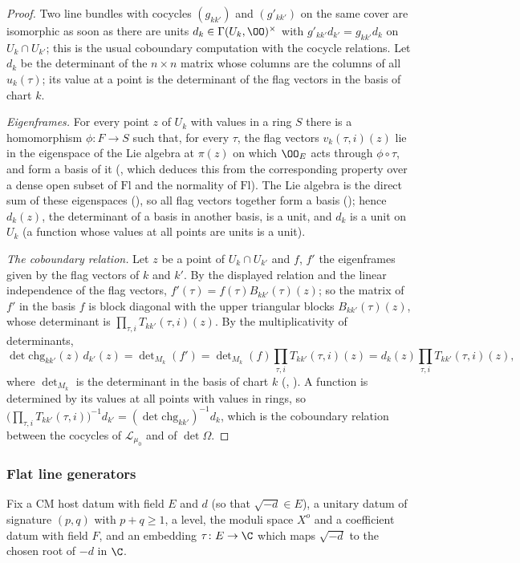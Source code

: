 \begin{proof}
Two line bundles with cocycles $(g_{kk'})$ and $(g'_{kk'})$ on the same cover are isomorphic as soon as
there are units $d_k\in\Gamma(U_k,\OO)^\times$ with $g'_{kk'}d_{k'}=g_{kk'}d_k$ on $U_k\cap U_{k'}$; this is
the usual coboundary computation with the cocycle relations. Let $d_k$ be the determinant of the $n\times n$
matrix whose columns are the columns of all $u_k(\tau)$; its value at a point is the determinant of the
flag vectors in the basis of chart $k$.

\emph{Eigenframes.} For every point $z$ of $U_k$ with values in a ring $S$ there is a homomorphism
$\phi\colon F\to S$ such that, for every $\tau$, the flag vectors $v_k(\tau,i)(z)$ lie in the eigenspace of
the Lie algebra at $\pi(z)$ on which $\OO_E$ acts through $\phi\circ\tau$, and form a basis of it
(, which deduces this from the corresponding property over a
dense open subset of $\mathrm{Fl}$ and the normality of $\mathrm{Fl}$). The Lie algebra is the direct sum of
these eigenspaces (), so all flag vectors
together form a basis (); hence $d_k(z)$, the determinant of a
basis in another basis, is a unit, and $d_k$ is a unit on $U_k$ (a function whose values at all points are
units is a unit).

\emph{The coboundary relation.} Let $z$ be a point of $U_k\cap U_{k'}$ and $f$, $f'$ the eigenframes given by
the flag vectors of $k$ and $k'$. By the displayed relation and the linear independence of the flag
vectors, $f'(\tau)=f(\tau)B_{kk'}(\tau)(z)$; so the matrix of $f'$ in the basis $f$ is block diagonal with the
upper triangular blocks $B_{kk'}(\tau)(z)$, whose determinant is $\prod_{\tau,i}T_{kk'}(\tau,i)(z)$. By the
multiplicativity of determinants,
\[
\det\mathrm{chg}_{kk'}(z)\,d_{k'}(z)=\det\nolimits_{M_k}(f')=\det\nolimits_{M_k}(f)\prod_{\tau,i}T_{kk'}(\tau,i)(z)
=d_k(z)\prod_{\tau,i}T_{kk'}(\tau,i)(z),
\]
where $\det_{M_k}$ is the determinant in the basis of chart $k$
(, ). A
function is determined by its values at all points with values in rings, so
$\bigl(\prod_{\tau,i}T_{kk'}(\tau,i)\bigr)^{-1}d_{k'}=(\det\mathrm{chg}_{kk'})^{-1}d_k$, which is the
coboundary relation between the cocycles of $\mathcal L_{\mu_0}$ and of $\det\Omega$.
\end{proof}

\subsubsection*{Flat line generators}
Fix a CM host datum with field $E$ and $d$ (so that $\sqrt{-d}\in E$), a unitary datum of signature
$(p,q)$ with $p+q\ge1$, a level, the moduli space $X^o$ and a coefficient datum with field $F$, and an
embedding $\tau\colon E\to\C$ which maps $\sqrt{-d}$ to the chosen root of $-d$ in $\C$.


